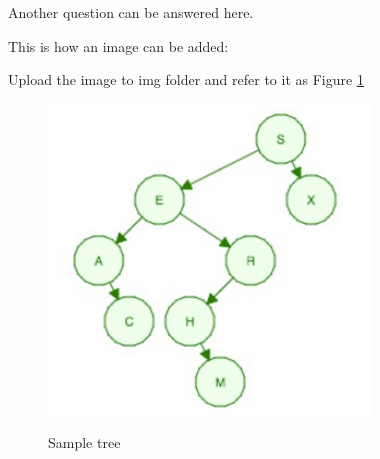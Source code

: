 \documentclass[a4paper,11pt]{article}
\theoremstyle{mytheor}
\begin{document}
Another question can be answered here.

This is how an image can be added:

Upload the image to img folder and refer to it as Figure \ref{fig:sampletree}
\begin{figure}[h]
\caption{Sample tree}
\includegraphics[scale=.6]{sampletree}
\centering
\label{fig:sampletree}
\end{figure}
\end{document}
